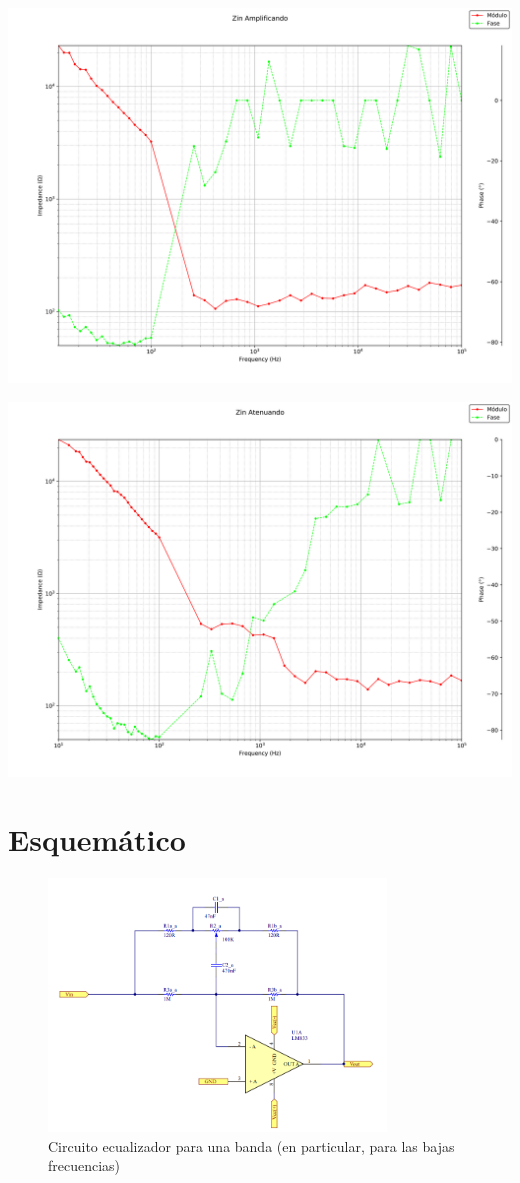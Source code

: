 \documentclass[a4paper,12pt,oneside,pdflatex,italian,final,twocolumn]{article}
\begin{document}
\begin{minipage}{0.47\textwidth}
  \includegraphics[width=\textwidth]{Zin_H}
\end{minipage}
\hfill
\begin{minipage}{0.47\textwidth}
  \includegraphics[width=\textwidth]{Zin_L}
\end{minipage}


\newpage
\section{Esquemático}

\begin{figure} [h]
  \centering
  \includegraphics[width=0.8\textwidth, left]{EQL}
  \caption{Circuito ecualizador para una banda (en particular, para las bajas frecuencias)}

\end{figure}
\end{document}
